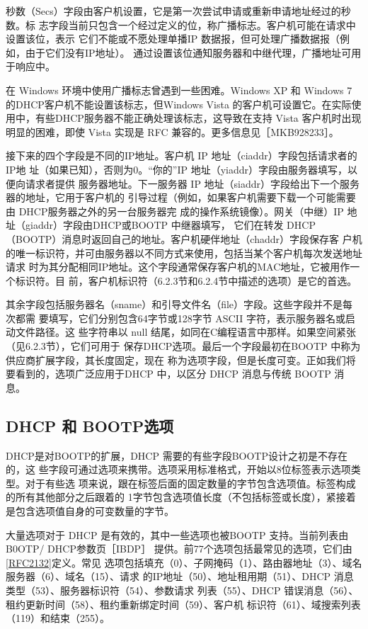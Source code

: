 秒数（Secs）字段由客户机设置，它是第一次尝试申请或重新申请地址经过的秒数。标
志字段当前只包含一个经过定义的位，称广播标志。客户机可能在请求中设置该位，表示
它们不能或不愿处理单播IP 数据报，但可处理广播数据报（例如，由于它们没有IP地址）。
通过设置该位通知服务器和中继代理，广播地址可用于响应中。

\begin{tcolorbox}
  在 Windows 环境中使用广播标志曾遇到一些困难。Windows XP 和 Windows 7
  的DHCP客户机不能设置该标志，但Windows Vista 的客户机可设置它。在实际使
  用中，有些DHCP服务器不能正确处理该标志，这导致在支持 Vista 客户机时出现
  明显的困难，即使 Vista 实现是 RFC 兼容的。更多信息见［MKB928233］。
\end{tcolorbox}

接下来的四个字段是不同的IP地址。客户机 IP 地址（ciaddr）字段包括请求者的IP地
址（如果已知），否则为0。“你的”IP 地址（yiaddr）字段由服务器填写，以便向请求者提供
服务器地址。下一服务器 IP 地址（siaddr）字段给出下一个服务器的地址，它用于客户机的
引导过程（例如，如果客户机需要下载一个可能需要由 DHCP服务器之外的另一台服务器完
成的操作系统镜像）。网关（中继）IP 地址（giaddr）字段由DHCP或BOOTP 中继器填写，
它们在转发 DHCP（BOOTP）消息时返回自己的地址。客户机硬伴地址（chaddr）字段保存客
户机的唯一标识符，并可由服务器以不同方式来使用，包括当某个客户机每次发送地址请求
时为其分配相同IP地址。这个字段通常保存客户机的MAC地址，它被用作一个标识符。目
前，客户机标识符（6.2.3节和6.2.4节中描述的选项）是它的首选。

其余字段包括服务器名（sname）和引导文件名（file）字段。这些字段并不是每次都需
要填写，它们分别包含64字节或128字节 ASCII 字符，表示服务器名或启动文件路径。这
些字符串以 null 结尾，如同在C编程语言中那样。如果空间紧张（见6.2.3节），它们可用于
保存DHCP选项。最后一个字段最初在BOOTP 中称为供应商扩展字段，其长度固定，现在
称为选项字段，但是长度可变。正如我们将要看到的，选项广泛应用于DHCP 中，以区分
DHCP 消息与传统 BOOTP 消息。

\subsection{DHCP 和 BOOTP选项}
DHCP是对BOOTP的扩展，DHCP 需要的有些字段BOOTP设计之初是不存在的，这
些字段可通过选项来携带。选项采用标准格式，开始以8位标签表示选项类型。对于有些选
项来说，跟在标签后面的固定数量的字节包含选项值。标签构成的所有其他部分之后跟着的
1字节包含选项值长度（不包括标签或长度），紧接着是包含选项值自身的可变数量的字节。

大量选项对于 DHCP 是有效的，其中一些选项也被BOOTP 支持。当前列表由B0OTP/
DHCP参数页［IBDP］
提供。前77个选项包括最常见的选项，它们由\href{https://www.rfc-editor.org/rfc/rfc2132}{\href{https://www.rfc-editor.org/rfc/rfc2132}{[RFC2132]}}定义。常见
选项包括填充（0）、子网掩码（1）、路由器地址（3）、域名服务器（6）、域名（15）、请求
的IP地址（50）、地址租用期（51）、DHCP 消息类型（53）、服务器标识符（54）、参数请求
列表（55）、DHCP 错误消息（56）、租约更新时间（58）、租约重新绑定时间（59）、客户机
标识符（61）、域搜索列表（119）和结束（255）。


